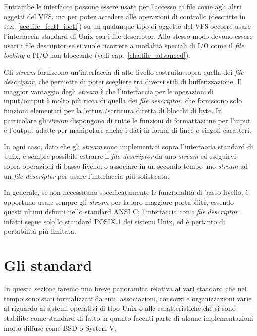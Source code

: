 Entrambe le interfacce possono essere usate per l'accesso ai file come agli
altri oggetti del VFS, ma per poter accedere alle operazioni di controllo
(descritte in sez.~\ref{sec:file_fcntl_ioctl}) su un qualunque tipo di oggetto
del VFS occorre usare l'interfaccia standard di Unix con i file
descriptor. Allo stesso modo devono essere usati i file descriptor se si vuole
ricorrere a modalità speciali di I/O come il \textit{file locking} o l'I/O
non-bloccante (vedi cap.~\ref{cha:file_advanced}).

Gli \textit{stream} forniscono un'interfaccia di alto livello costruita sopra
quella dei \textit{file descriptor}, che permette di poter scegliere tra
diversi stili di bufferizzazione.  Il maggior vantaggio degli \textit{stream}
è che l'interfaccia per le operazioni di input/output è molto più ricca di
quella dei \textit{file descriptor}, che forniscono solo funzioni elementari
per la lettura/scrittura diretta di blocchi di byte.  In particolare gli
\textit{stream} dispongono di tutte le funzioni di formattazione per l'input e
l'output adatte per manipolare anche i dati in forma di linee o singoli
caratteri.

In ogni caso, dato che gli \textit{stream} sono implementati sopra
l'interfaccia standard di Unix, è sempre possibile estrarre il \textit{file
  descriptor} da uno \textit{stream} ed eseguirvi sopra operazioni di basso
livello, o associare in un secondo tempo uno \textit{stream} ad un
\textit{file descriptor} per usare l'interfaccia più sofisticata.

In generale, se non necessitano specificatamente le funzionalità di basso
livello, è opportuno usare sempre gli \textit{stream} per la loro maggiore
portabilità, essendo questi ultimi definiti nello standard ANSI C;
l'interfaccia con i \textit{file descriptor} infatti segue solo lo standard
POSIX.1 dei sistemi Unix, ed è pertanto di portabilità più limitata.


\section{Gli standard}
\label{sec:intro_standard}

In questa sezione faremo una breve panoramica relativa ai vari standard che
nel tempo sono stati formalizzati da enti, associazioni, consorzi e
organizzazioni varie al riguardo ai sistemi operativi di tipo Unix o alle
caratteristiche che si sono stabilite come standard di fatto in quanto facenti
parte di alcune implementazioni molto diffuse come BSD o System V.

